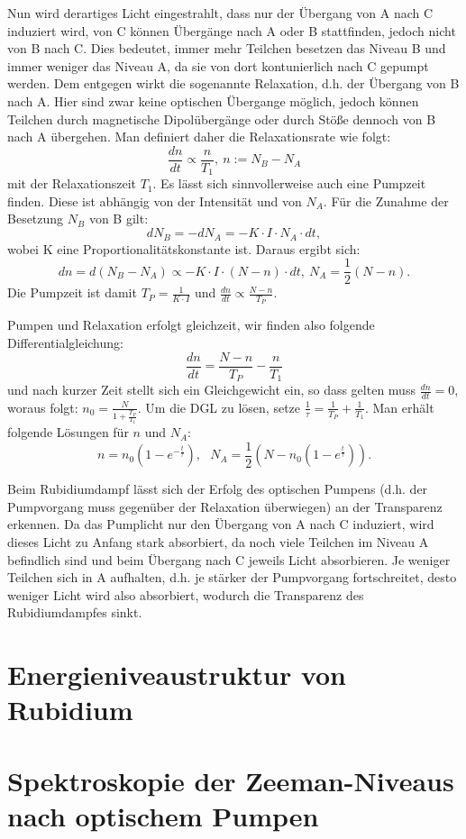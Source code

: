 \documentclass[bigchapter,colorback,accentcolor=tud4b,linedtoc,11pt]{tudreport}
\begin{document}
Nun wird derartiges Licht eingestrahlt, dass nur der Übergang von A nach C induziert wird, von C können Übergänge nach A oder B stattfinden, jedoch nicht von B nach C. Dies bedeutet, immer mehr Teilchen besetzen das Niveau B und immer weniger das Niveau A, da sie von dort kontunierlich nach C gepumpt werden. Dem entgegen wirkt die sogenannte Relaxation, d.h. der Übergang von B nach A. Hier sind zwar keine optischen Übergange möglich, jedoch können Teilchen durch magnetische Dipolübergänge oder durch Stöße dennoch von B nach A übergehen. Man definiert daher die Relaxationsrate wie folgt: 
$$\frac{d n}{d t} \propto \frac{n}{T_1},~ n := N_B-N_A$$
mit der Relaxationszeit $T_1$. Es lässt sich sinnvollerweise auch eine Pumpzeit finden. Diese ist abhängig von der Intensität und von $N_A$. Für die Zunahme der Besetzung $N_B$ von B gilt:
$$d N_B = - d N_A = -K \cdot I \cdot N_A \cdot d t,$$
wobei K eine Proportionalitätskonstante ist. Daraus ergibt sich:
$$d n = d (N_B-N_A) \propto -K \cdot I \cdot (N-n) \cdot d t,~ N_A = \frac{1}{2} (N-n).$$ 
Die Pumpzeit ist damit $T_P = \frac{1}{K \cdot I}$ und $\frac{d n}{d t} \propto \frac{N-n}{T_P}$.

Pumpen und Relaxation erfolgt gleichzeit, wir finden also folgende Differentialgleichung:
$$\frac{d n}{d t} = \frac{N-n}{T_P} - \frac{n}{T_1}$$
und nach kurzer Zeit stellt sich ein Gleichgewicht ein, so dass gelten muss $\frac{d n}{d t} = 0$, woraus folgt: $n_0 = \frac{N}{1+\frac{T_P}{T_1}}$. Um die DGL zu lösen, setze $\frac{1}{\tau} = \frac{1}{T_P} + \frac{1}{T_1}$. Man erhält folgende Lösungen für $n$ und $N_A$:
$$n = n_0 (1-e^{-\frac{t}{\tau}}),~~~ N_A = \frac{1}{2} (N-n_0 (1-e^{\frac{t}{\tau}})).$$

Beim Rubidiumdampf lässt sich der Erfolg des optischen Pumpens (d.h. der Pumpvorgang muss gegenüber der Relaxation überwiegen) an der Transparenz erkennen. Da das Pumplicht nur den Übergang von A nach C induziert, wird dieses Licht zu Anfang stark absorbiert, da noch viele Teilchen im Niveau A befindlich sind und beim Übergang nach C jeweils Licht absorbieren. Je weniger Teilchen sich in A aufhalten, d.h. je stärker der Pumpvorgang fortschreitet, desto weniger Licht wird also absorbiert, wodurch die Transparenz des Rubidiumdampfes sinkt. 

\section{Energieniveaustruktur von Rubidium}

\section{Spektroskopie der Zeeman-Niveaus nach optischem Pumpen}
\end{document}
